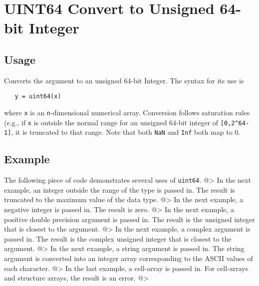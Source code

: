 \section{UINT64 Convert to Unsigned 64-bit Integer}

\subsection{Usage}

Converts the argument to an unsigned 64-bit Integer.  The syntax
for its use is
\begin{verbatim}
   y = uint64(x)
\end{verbatim}
where \verb|x| is an \verb|n|-dimensional numerical array.  Conversion
follows saturation rules (e.g., if \verb|x| is outside the normal
range for an unsigned 64-bit integer of \verb|[0,2^64-1]|, it is
truncated to that range.  Note that both \verb|NaN| and \verb|Inf| both map to 0.
\subsection{Example}

The following piece of code demonstrates several uses of \verb|uint64|.
@>
In the next example, an integer outside the range  of the type is passed in.
The result is truncated to the maximum value of the data type.
@>
In the next example, a negative integer is passed in.  The result is zero.
@>
In the next example, a positive double precision argument is passed in.  
The result is the unsigned integer that is closest to the argument.
@>
In the next example, a complex argument is passed in.  The result is the 
complex unsigned integer that is closest to the argument.
@>
In the next example, a string argument is passed in.  The string argument is 
converted into an integer array corresponding to the ASCII values of each character.
@>
In the last example, a cell-array is passed in.  For cell-arrays and structure 
arrays, the result is an error.
@>
